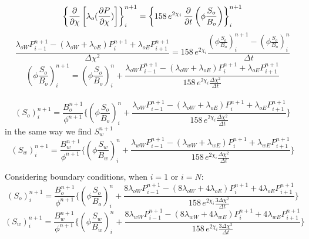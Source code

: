 \documentclass[12pt,letterpaper,titlepage]{article}
\begin{document}
\begin{equation*}
\left\{\pdv{}{\chi}\left[\lambda_o(\pdv{P}{\chi})\right]\right\}_i^{n+1}= \left\{158\, e^{2\chi_i}\, \pdv{}{t}\left(\phi \frac{S_o}{B_o}\right)\right\}^{n+1}_i
\end{equation*} 
\begin{equation*}
\frac{\lambda_{oW} P_{i-1}^{n+1}-(\lambda_{oW}+\lambda_{oE})P_i^{n+1}+\lambda_{oE} P^{n+1}_{i+1}}{\Delta\chi^2}=158\,e^{2\chi_i}  \frac{\left(\phi \frac{S_o}{B_o}\right)_i^{n+1}-\left(\phi \frac{S_o}{B_o}\right)_i^n}{\Delta t}
\end{equation*}
\begin{equation*}
\left(\phi \frac{S_o}{B_o}\right)_i^{n+1}=\left(\phi \frac{S_o}{B_o}\right)_i^n +
\frac{\lambda_{oW} P_{i-1}^{n+1}-(\lambda_{oW}+\lambda_{oE})P_i^{n+1}+\lambda_{oE} P^{n+1}_{i+1}}{158\,e^{2\chi_i}\frac{\Delta\chi^2}{\Delta t}}
\end{equation*}
\\
\begin{equation}
\left({S_o}\right)_i^{n+1}=\frac{B_o^{n+1}}{\phi^{n+1}}\Bigg\{\left(\phi \frac{S_o}{B_o}\right)_i^n +
\frac{\lambda_{oW} P_{i-1}^{n+1}-(\lambda_{oW}+\lambda_{oE})P_i^{n+1}+\lambda_{oE} P^{n+1}_{i+1}}{158\,e^{2\chi_i}\frac{\Delta\chi^2}{\Delta t}}\Bigg\}
\end{equation}
in the same way we find $S_w^{n+1}$
\begin{equation}
\left({S_w}\right)_i^{n+1}=\frac{B_w^{n+1}}{\phi^{n+1}}\Bigg\{\left(\phi \frac{S_w}{B_w}\right)_i^n +
\frac{\lambda_{wW} P_{i-1}^{n+1}-(\lambda_{wW}+\lambda_{wE})P_i^{n+1}+\lambda_{wE} P^{n+1}_{i+1}}{158\,e^{2\chi_i}\frac{\Delta\chi^2}{\Delta t}}\Bigg\}
\end{equation}

Considering boundary conditions, when $i=1$ or $i=N$:
\begin{equation}
\label{so}
\left({S_o}\right)_i^{n+1}=\frac{B_o^{n+1}}{\phi^{n+1}}\Bigg\{\left(\phi \frac{S_o}{B_o}\right)_i^n +
\frac{8\lambda_{oW} P_{i-1}^{n+1}-(8\lambda_{oW}+4\lambda_{oE})P_i^{n+1}+4\lambda_{oE} P^{n+1}_{i+1}}{158\,e^{2\chi_i}\frac{3\Delta\chi^2}{\Delta t}}\Bigg\}
\end{equation}
\begin{equation}
\label{sw}
\left({S_w}\right)_i^{n+1}=\frac{B_w^{n+1}}{\phi^{n+1}}\Bigg\{\left(\phi \frac{S_w}{B_w}\right)_i^n +
\frac{8\lambda_{wW} P_{i-1}^{n+1}-(8\lambda_{wW}+4\lambda_{wE})P_i^{n+1}+4\lambda_{wE} P^{n+1}_{i+1}}{158\,e^{2\chi_i}\frac{3\Delta\chi^2}{\Delta t}}\Bigg\}
\end{equation}
\end{document}
